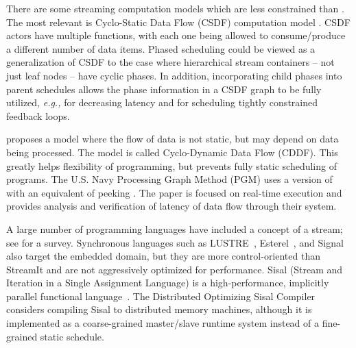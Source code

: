 There are some streaming computation models which are less constrained
than {\SDF}. The most relevant is Cyclo-Static Data Flow (CSDF)
computation model \cite{BELP96,parks95comparison}.  CSDF actors have
multiple {\work} functions, with each one being allowed to
consume/produce a different number of data items.  Phased scheduling
could be viewed as a generalization of CSDF to the case where
hierarchical stream containers -- not just leaf nodes -- have cyclic
phases.  In addition, incorporating child phases into parent schedules
allows the phase information in a CSDF graph to be fully utilized,
{\it e.g.,} for decreasing latency and for scheduling tightly
constrained feedback loops.

\cite{wauters96cyclodynamic} proposes a model where the flow of data
is not static, but may depend on data being processed. The model is
called Cyclo-Dynamic Data Flow (CDDF). This greatly helps flexibility
of programming, but prevents fully static scheduling of programs. The
U.S. Navy Processing Graph Method (PGM) uses a version of {\SDF} with
an equivalent of peeking \cite{goddard00navy}.  The paper is focused
on real-time execution and provides analysis and verification of
latency of data flow through their system.

A large number of programming languages have included a concept of a
stream; see \cite{survey97} for a survey.  Synchronous languages such
as LUSTRE~\cite{lustre}, Esterel~\cite{esterel92}, and
Signal~\cite{signal} also target the embedded domain, but they are
more control-oriented than StreamIt and are not aggressively optimized
for performance.  Sisal (Stream and Iteration in a Single Assignment
Language) is a high-performance, implicitly parallel functional
language~\cite{sisal}.  The Distributed Optimizing Sisal
Compiler~\cite{sisal} considers compiling Sisal to distributed memory
machines, although it is implemented as a coarse-grained master/slave
runtime system instead of a fine-grained static schedule.



